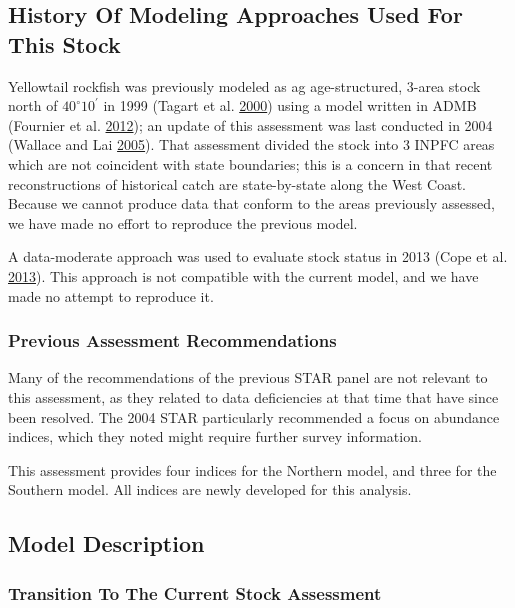 \documentclass[12pt,]{article}
\begin{document}
\subsection{History Of Modeling Approaches Used For This
Stock}\label{history-of-modeling-approaches-used-for-this-stock}

Yellowtail rockfish was previously modeled as ag age-structured, 3-area
stock north of \(40^\circ 10^\prime\) in 1999 (Tagart et al.
\protect\hyperlink{ref-Tagart2000}{2000}) using a model written in ADMB
(Fournier et al. \protect\hyperlink{ref-Fournier2012}{2012}); an update
of this assessment was last conducted in 2004 (Wallace and Lai
\protect\hyperlink{ref-Wallace2005}{2005}). That assessment divided the
stock into 3 INPFC areas which are not coincident with state boundaries;
this is a concern in that recent reconstructions of historical catch are
state-by-state along the West Coast. Because we cannot produce data that
conform to the areas previously assessed, we have made no effort to
reproduce the previous model.

A data-moderate approach was used to evaluate stock status in 2013 (Cope
et al. \protect\hyperlink{ref-Cope2013}{2013}). This approach is not
compatible with the current model, and we have made no attempt to
reproduce it.

\subsubsection{Previous Assessment
Recommendations}\label{previous-assessment-recommendations}

Many of the recommendations of the previous STAR panel are not relevant
to this assessment, as they related to data deficiencies at that time
that have since been resolved. The 2004 STAR particularly recommended a
focus on abundance indices, which they noted might require further
survey information.

This assessment provides four indices for the Northern model, and three
for the Southern model. All indices are newly developed for this
analysis.

\clearpage
\newpage

\subsection{Model Description}\label{model-description}

\subsubsection{Transition To The Current Stock
Assessment}\label{transition-to-the-current-stock-assessment}
\end{document}
